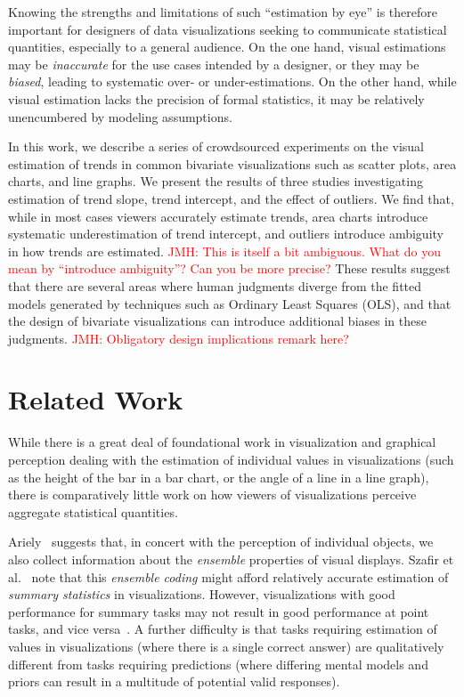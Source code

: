 \documentclass{sigchi}
\newcommand{\jeff}[1]{\textcolor{red}{JMH: #1}}
\begin{document}
Knowing the strengths and limitations of such ``estimation by eye'' is therefore important for designers of data visualizations seeking to communicate statistical quantities, especially to a general audience. On the one hand, visual estimations may be \emph{inaccurate} for the use cases intended by a designer, or they may be \emph{biased}, leading to systematic over- or under-estimations. On the other hand, while visual estimation lacks the precision of formal statistics, it may be relatively unencumbered by modeling assumptions.

In this work, we describe a series of crowdsourced experiments on the visual estimation of trends in common bivariate visualizations such as scatter plots, area charts, and line graphs. We present the results of three studies investigating estimation of trend slope, trend intercept, and the effect of outliers. We find that, while in most cases viewers accurately estimate trends, area charts introduce systematic underestimation of trend intercept, and outliers introduce ambiguity in how trends are estimated. \jeff{This is itself a bit ambiguous. What do you mean by ``introduce ambiguity''? Can you be more precise?} These results suggest that there are several areas where human judgments diverge from the fitted models generated by techniques such as Ordinary Least Squares (OLS), and that the design of bivariate visualizations can introduce additional biases in these judgments. \jeff{Obligatory design implications remark here?}

\section{Related Work}

While there is a great deal of foundational work in visualization and graphical perception dealing with the estimation of individual values in visualizations (such as the height of the bar in a bar chart, or the angle of a line in a line graph), there is comparatively little work on how viewers of visualizations perceive aggregate statistical quantities.

Ariely~\cite{ariely2001seeing} suggests that, in concert with the perception of individual objects, we also collect information about the \emph{ensemble} properties of visual displays. Szafir et al.~\cite{szafir2016four} note that this \emph{ensemble coding} might afford relatively accurate estimation of \emph{summary statistics} in visualizations. However, visualizations with good performance for summary tasks may not result in good performance at point tasks, and vice versa~\cite{albers2014task,fuchs2013evaluation}. A further difficulty is that tasks requiring estimation of values in visualizations (where there is a single correct answer) are qualitatively different from tasks requiring predictions (where differing mental models and priors can result in a multitude of potential valid responses).
\end{document}
